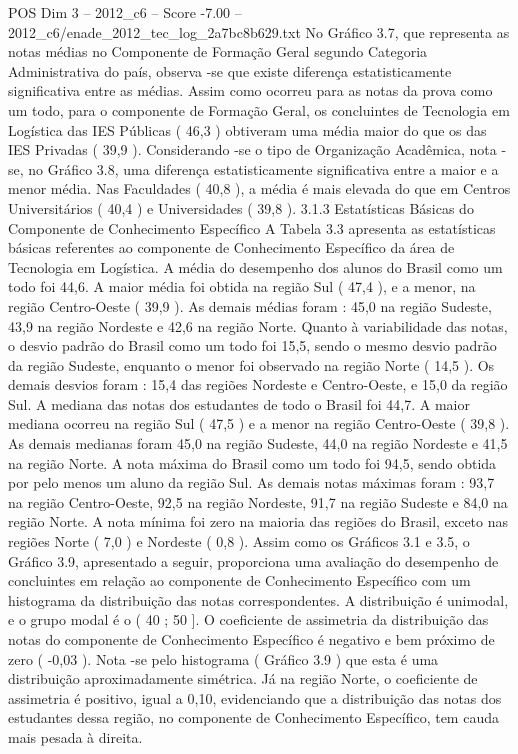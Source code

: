 \begin{textsample}{POS Dim 3 – 2012\_c6 – Score -7.00 – 2012\_c6/enade\_2012\_tec\_log\_2a7bc8b629.txt}
No Gráfico 3.7, que representa as notas médias no Componente de Formação Geral segundo Categoria Administrativa do país, observa -se que existe diferença estatisticamente significativa entre as médias.
Assim como ocorreu para as notas da prova como um todo, para o componente de Formação Geral, os concluintes de Tecnologia em Logística das IES Públicas ( 46,3 ) obtiveram uma média maior do que os das IES Privadas ( 39,9 ).
Considerando -se o tipo de Organização Acadêmica, nota -se, no Gráfico 3.8, uma diferença estatisticamente significativa entre a maior e a menor média.
Nas Faculdades ( 40,8 ), a média é mais elevada do que em Centros Universitários ( 40,4 ) e Universidades ( 39,8 ). 3.1.3 Estatísticas Básicas do Componente de Conhecimento Específico A Tabela 3.3 apresenta as estatísticas básicas referentes ao componente de Conhecimento Específico da área de Tecnologia em Logística.
A média do desempenho dos alunos do Brasil como um todo foi 44,6.
A maior média foi obtida na região Sul ( 47,4 ), e a menor, na região Centro-Oeste ( 39,9 ).
As demais médias foram : 45,0 na região Sudeste, 43,9 na região Nordeste e 42,6 na região Norte.
Quanto à variabilidade das notas, o desvio padrão do Brasil como um todo foi 15,5, sendo o mesmo desvio padrão da região Sudeste, enquanto o menor foi observado na região Norte ( 14,5 ).
Os demais desvios foram : 15,4 das regiões Nordeste e Centro-Oeste, e 15,0 da região Sul.
A mediana das notas dos estudantes de todo o Brasil foi 44,7.
A maior mediana ocorreu na região Sul ( 47,5 ) e a menor na região Centro-Oeste ( 39,8 ).
As demais medianas foram 45,0 na região Sudeste, 44,0 na região Nordeste e 41,5 na região Norte.
A nota máxima do Brasil como um todo foi 94,5, sendo obtida por pelo menos um aluno da região Sul.
As demais notas máximas foram : 93,7 na região Centro-Oeste, 92,5 na região Nordeste, 91,7 na região Sudeste e 84,0 na região Norte.
A nota mínima foi zero na maioria das regiões do Brasil, exceto nas regiões Norte ( 7,0 ) e Nordeste ( 0,8 ).
Assim como os Gráficos 3.1 e 3.5, o Gráfico 3.9, apresentado a seguir, proporciona uma avaliação do desempenho de concluintes em relação ao componente de Conhecimento Específico com um histograma da distribuição das notas correspondentes.
A distribuição é unimodal, e o grupo modal é o ( 40 ; 50 ].
O coeficiente de assimetria da distribuição das notas do componente de Conhecimento Específico é negativo e bem próximo de zero ( -0,03 ).
Nota -se pelo histograma ( Gráfico 3.9 ) que esta é uma distribuição aproximadamente simétrica.
Já na região Norte, o coeficiente de assimetria é positivo, igual a 0,10, evidenciando que a distribuição das notas dos estudantes dessa região, no componente de Conhecimento Específico, tem cauda mais pesada à direita.

\end{textsample}
